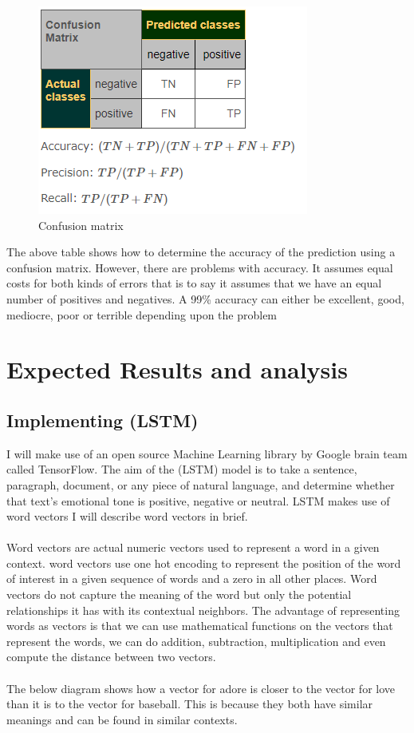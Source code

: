 \begin{figure}[h]
    \centering
    \includegraphics{images/confusion_matrix.png}
    \caption{Confusion matrix}
\end{figure}

  The above table shows how to determine the accuracy of the prediction using a confusion matrix. However, there are problems with accuracy. It assumes equal costs for both kinds of errors that is to say it assumes that we have an equal number of positives and negatives. A 99\% accuracy can either be excellent, good, mediocre, poor or terrible depending upon the problem
  
\section{Expected Results and analysis}

\subsection{Implementing (LSTM)}

I will make use of an open source Machine Learning library by Google brain team called TensorFlow. The aim of the (LSTM) model is to take a sentence, paragraph, document, or any piece of natural language, and determine whether that text's emotional tone is positive, negative or neutral. LSTM makes use of word vectors I will describe word vectors in brief.\\ \\
Word vectors are actual numeric vectors used to represent a word in a given context. word vectors use one hot encoding to represent the position of the word of interest in a given sequence of words and a zero in all other places. Word vectors do not capture the meaning of the word but only the potential relationships it has with its contextual neighbors. The advantage of representing words as vectors is that we can use mathematical functions on the vectors that represent the words, we can do addition, subtraction, multiplication and even compute the distance between two vectors.\\ \\
The below diagram shows how a vector for adore is closer to the vector for love than it is to the vector for baseball. This is because they both have similar meanings and can be found in similar contexts.


